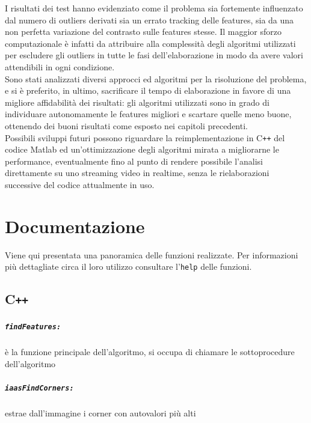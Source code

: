 \documentclass[12pt]{report}
\begin{document}
\noindent I risultati dei test hanno evidenziato come il problema sia fortemente influenzato dal numero di outliers derivati sia un errato tracking delle features, sia da una non perfetta variazione del contrasto sulle features stesse. Il maggior sforzo computazionale \`e infatti da attribuire alla complessit\`a degli algoritmi utilizzati per escludere gli outliers in tutte le fasi dell'elaborazione in modo da avere valori attendibili in ogni condizione.\\

\noindent Sono stati analizzati diversi approcci ed algoritmi per la risoluzione del problema, e si \`e preferito, in ultimo, sacrificare il tempo di elaborazione in favore di una migliore affidabilit\`a dei risultati: gli algoritmi utilizzati sono in grado di individuare autonomamente le features migliori e scartare quelle meno buone, ottenendo dei buoni risultati come esposto nei capitoli precedenti.\\

\noindent Possibili sviluppi futuri possono riguardare la reimplementazione in C\verb|++| del codice Matlab ed un'ottimizzazione degli algoritmi mirata a migliorarne le performance, eventualmente fino al punto di rendere possibile l'analisi direttamente su uno streaming video in realtime, senza le rielaborazioni successive del codice attualmente in uso.





\chapter{Documentazione}


Viene qui presentata una panoramica delle funzioni realizzate. Per informazioni pi\`u dettagliate circa il loro utilizzo consultare l'\verb|help| delle funzioni.

\section[C++]{C\verb_++_}

\paragraph*{\verb_findFeatures:_} \`e la funzione principale dell'algoritmo, si occupa di chiamare le sottoprocedure dell'algoritmo

\paragraph*{\verb_iaasFindCorners:_} estrae dall'immagine i corner con autovalori pi\`u alti
\end{document}
